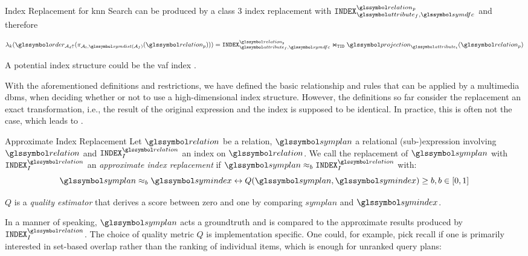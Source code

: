 \begin{example}[label=example:index_replacement]{Index Replacement for \acrshort{knn} Search}{}
    can be produced by a class 3 index replacement with $\mathtt{INDEX}^{\relation_{p}}_{\attribute_f, \symdfc}$ and therefore

    \begin{equation*}
        \lambda_k (\order_{\mathcal{A}_d\uparrow} ( \pi_{\mathcal{A}_{t}, \symdist(\mathcal{A}_{f})} ( \relation_p))) = \mathtt{INDEX}^{\relation_{\mathtt{p}}}_{\attribute_f, \symdfc} \Join_{\mathtt{TID}} \projection_{\attribute_{t}} (\relation_p)
    \end{equation*}
    
    A potential index structure could be the \acrshort{vaf} index \cite{Weber:1998Va}.
\end{example}

With the aforementioned definitions and restrictions, we have defined the basic relationship and rules that can be applied by a multimedia \acrshort{dbms}, when deciding whether or not to use a high-dimensional index structure. However, the definitions so far consider the replacement an exact transformation, i.e., the result of the original expression and the index is supposed to be identical. In practice, this is often not the case, which leads to .

\begin{definition}[label=definition:index_replacement_approximate]{Approximate Index Replacement}{}
    Let $\relation$ be a relation, $\symplan$ a relational (sub-)expression involving $\relation$ and $\mathtt{INDEX}^{\relation}_{I}$ an index on $\relation$. We call the replacement of $\symplan$ with $\mathtt{INDEX}^{\relation}_{I}$ an \emph{approximate index replacement} if $\symplan \approx_{b} \mathtt{INDEX}^{\relation}_{I}$ with:
    \begin{equation*}
        \symplan \approx_{b} \symindex \leftrightarrow Q(\symplan,\symindex) \geq b, b \in [0, 1]
    \end{equation*}

     $Q$ is a \emph{quality estimator} that derives a score between zero and one by comparing $symplan$ and $\symindex$.
\end{definition}  

In a manner of speaking, $\symplan$ acts a groundtruth and is compared to the approximate results produced by $\mathtt{INDEX}^{\relation}_{I}$. The choice of quality metric $Q$ is implementation specific. One could, for example, pick recall if one is primarily interested in set-based overlap rather than the ranking of individual items, which is enough for unranked query plans:

